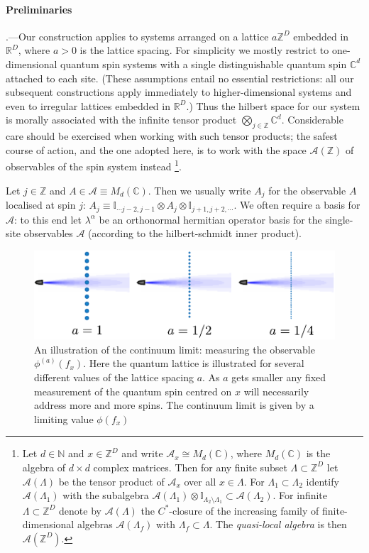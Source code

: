 \documentclass[prl,twocolumn,lengthcheck,superscriptaddress]{revtex4-1}
\theoremstyle{definition}
\theoremstyle{remark}
\begin{document}
\paragraph{Preliminaries}\hspace{-1em}.---Our construction applies to systems arranged on a lattice $a\mathbb{Z}^D$ embedded in $\mathbb{R}^D$, where $a>0$ is the lattice spacing. For simplicity we mostly restrict to one-dimensional quantum spin systems with a single distinguishable quantum spin $\mathbb{C}^d$ attached to each site. (These assumptions entail no essential restrictions: all our subsequent constructions apply immediately to higher-dimensional systems and even to irregular lattices embedded in $\mathbb{R}^D$.) Thus the hilbert space for our system is morally associated with the infinite tensor product $\bigotimes_{j\in\mathbb{Z}} \mathbb{C}^d$. Considerable care should be exercised when working with such tensor products; the safest course of action, and the one adopted here, is to work with the space $\mathcal{A}(\mathbb{Z})$ of observables of the spin system instead \footnote{Let $d\in \mathbb{N}$ and $x \in \mathbb{Z}^D$ and write $\mathcal{A}_x  \cong M_d(\mathbb{C})$, where $M_d(\mathbb{C})$ is the algebra of $d\times d$ complex matrices. Then for any finite subset $\Lambda \subset \mathbb{Z}^D$ let $\mathcal{A}(\Lambda)$ be the tensor product of $\mathcal{A}_x$ over all $x\in \Lambda$. For $\Lambda_1\subset \Lambda_2$ identify $\mathcal{A}(\Lambda_1)$ with the subalgebra $\mathcal{A}(\Lambda_1)\otimes \mathbb{I}_{\Lambda_2\setminus \Lambda_1} \subset \mathcal{A}(\Lambda_2)$. For infinite $\Lambda \subset \mathbb{Z}^D$ denote by $\mathcal{A}(\Lambda)$ the $C^*$-closure of the increasing family of finite-dimensional algebras $\mathcal{A}(\Lambda_f)$ with $\Lambda_f \subset \Lambda$. The \emph{quasi-local algebra} is then $\mathcal{A}(\mathbb{Z}^D)$.}.

Let $j\in\mathbb{Z}$ and $A\in \mathcal{A}\equiv M_d(\mathbb{C})$. Then we usually write $A_j$ for the observable $A$ localised at spin $j$: $A_j \equiv \mathbb{I}_{\cdots j-2, j-1}\otimes A_j\otimes \mathbb{I}_{j+1,j+2,\cdots}$. We often require a basis for $\mathcal{A}$: to this end let $\lambda^{\alpha}$ be an orthonormal hermitian operator basis for the single-site observables $\mathcal{A}$ (according to the hilbert-schmidt inner product).

\begin{figure}
\includegraphics{decreasea.pdf}
\caption{An illustration of the continuum limit: measuring the observable $\phi^{(a)}( f_x)$. Here the quantum lattice is illustrated for several different values of the lattice spacing $a$. As $a$ gets smaller any fixed measurement of the quantum spin centred on $x$ will necessarily address more and more spins. The continuum limit is given by a limiting value $\phi(f_x)$}
\end{figure}
\end{document}
